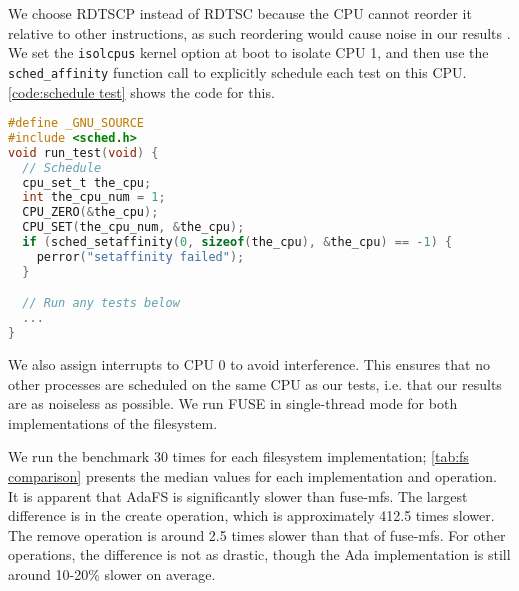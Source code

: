 We choose RDTSCP instead of RDTSC because the CPU cannot reorder it relative to other instructions, as such reordering would cause noise in our results \cite{delorie2016}.
We set the \lstinline{isolcpus} kernel option at boot to isolate CPU 1, and then use the \lstinline{sched_affinity} function call to explicitly schedule each test on this CPU.
\autoref{code:schedule test} shows the code for this.

\begin{lstlisting}[float=tb,caption={Schedule a test on CPU 1.}, label={code:schedule test}, language=C]
#define _GNU_SOURCE
#include <sched.h>
void run_test(void) {
  // Schedule
  cpu_set_t the_cpu;
  int the_cpu_num = 1;
  CPU_ZERO(&the_cpu);
  CPU_SET(the_cpu_num, &the_cpu);
  if (sched_setaffinity(0, sizeof(the_cpu), &the_cpu) == -1) {
    perror("setaffinity failed");
  }

  // Run any tests below
  ...
}
\end{lstlisting}

We also assign interrupts to CPU 0 to avoid interference.
This ensures that no other processes are scheduled on the same CPU as our tests, i.e. that our results are as noiseless as possible.
We run FUSE in single-thread mode for both implementations of the filesystem.

We run the benchmark 30 times for each filesystem implementation; \autoref{tab:fs comparison} presents the median values for each implementation and operation.
It is apparent that AdaFS is significantly slower than fuse-mfs.
The largest difference is in the create operation, which is approximately 412.5 times slower.
The remove operation is around 2.5 times slower than that of fuse-mfs.
For other operations, the difference is not as drastic, though the Ada implementation is still around 10-20\% slower on average.

